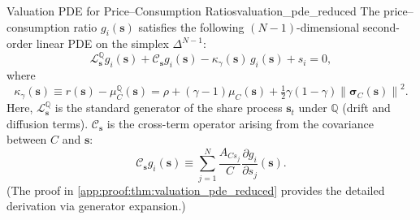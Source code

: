\documentclass[11pt,letterpaper,oneside]{article}
\numberwithin{equation}{section}
\newcommand{\1}{\mathbf{1}}
\newcommand{\norm}[1]{\left\lVert #1\right\rVert}
\begin{document}
\begin{theorem}{Valuation PDE for Price--Consumption Ratios}{valuation_pde_reduced}
The price--consumption ratio $g_i(\bm{s})$ satisfies the following $(N-1)$-dimensional second-order linear PDE on the simplex $\Delta^{N-1}$:
\begin{equation}\label{eq:pde_price}
  \mathcal{L}^{\mathbb{Q}}_{\bm{s}} g_i(\bm{s}) + \mathcal{C}_{\bm{s}} g_i(\bm{s}) - \kappa_\gamma(\bm{s})\, g_i(\bm{s}) + s_i = 0,
\end{equation}
where
\begin{equation}\label{eq:kappa_gamma}
  \kappa_\gamma(\bm{s}) \equiv r(\bm{s})-\mu_C^{\mathbb{Q}}(\bm{s}) = \rho + (\gamma-1)\mu_C(\bm{s}) + \tfrac12 \gamma(1-\gamma)\norm{\bm{\sigma}_C(\bm{s})}^2.
\end{equation}
Here, $\mathcal{L}^{\mathbb{Q}}_{\bm{s}}$ is the standard generator of the share process $\bm{s}_t$ under $\mathbb{Q}$ (drift and diffusion terms). $\mathcal{C}_{\bm{s}}$ is the cross-term operator arising from the covariance between $C$ and $\bm{s}$:
\begin{equation}\label{eq:pde_cross_term}
    \mathcal{C}_{\bm{s}} g_i(\bm{s}) \equiv \sum_{j=1}^N \frac{A_{C s_j}}{C} \frac{\partial g_i}{\partial s_j}(\bm{s}).
\end{equation}
(The proof in \cref{app:proof:thm:valuation_pde_reduced} provides the detailed derivation via generator expansion.)
\end{theorem}
\end{document}
